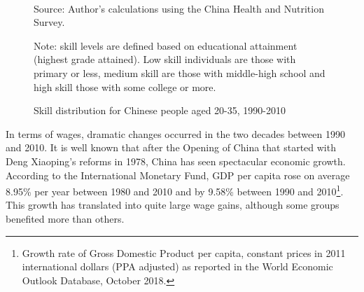 \documentclass[12pt]{article}
\newcommand{\source}[1]{\caption*{Source: {#1}} }
\newcommand{\note}[1]{\caption*{Note: {#1}} }
\begin{document}
\begin{figure}[hp]
	\centering
	\caption{Skill distribution for Chinese people aged 20-35, 1990-2010}\label{fig:skill_dist}
	\\
	\source{Author's calculations using the China Health and Nutrition Survey.}
	\note{skill levels are defined based on educational attainment (highest grade attained). Low skill individuals are those with primary or less, medium skill are those with middle-high school and high skill those with some college or more.}
\end{figure}

In terms of wages, dramatic changes occurred in the two decades between 1990 and 2010. It is well known that after the Opening of China that started with Deng Xiaoping's reforms in 1978, China has seen spectacular economic growth. According to the International Monetary Fund, GDP per capita rose on average 8.95\% per year between 1980 and 2010 and by 9.58\% between 1990 and 2010\footnote{Growth rate of Gross Domestic Product per capita, constant prices in 2011 international dollars (PPA adjusted) as reported in the World Economic Outlook Database, October 2018.}. This growth has translated into quite large wage gains, although some groups benefited more than others.
\end{document}
